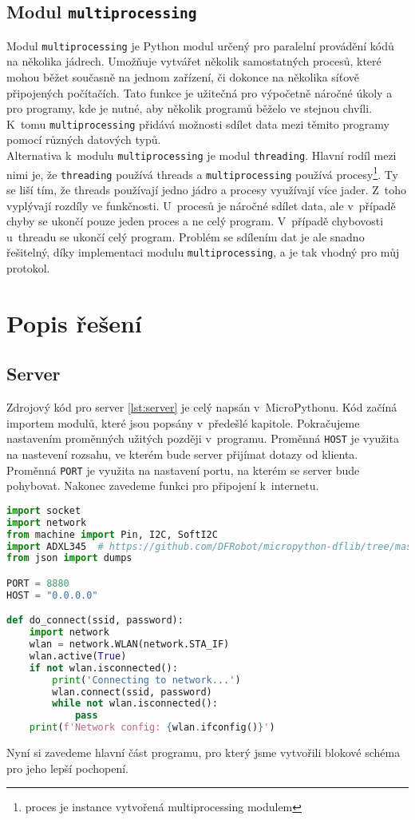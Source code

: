 \documentclass[12pt]{report}			%
\begin{document}
\subsection{Modul \texttt{multiprocessing}}
Modul \texttt{multiprocessing} je Python modul určený pro paralelní provádění kódů na několika jádrech. Umožňuje vytvářet několik samostatných procesů, které mohou běžet současně na jednom zařízení, či dokonce na několika síťově připojených počítačích. Tato funkce je užitečná pro výpočetně náročné úkoly a pro programy, kde je nutné, aby několik programů běželo ve stejnou chvíli. K~tomu \texttt{multiprocessing} přidává možnosti sdílet data mezi těmito programy pomocí různých datových typů. \cite{multiprocess}
\\
Alternativa k~modulu \texttt{multiprocessing} je modul \texttt{threading}. Hlavní rodíl mezi nimi je, že \texttt{threading} používá threads a \texttt{multiprocessing} používá procesy\footnote{proces je instance vytvořená multiprocessing modulem}. Ty se liší tím, že threads používají jedno jádro a procesy využívají více jader. Z~toho vyplývají rozdíly ve funkčnosti. U~procesů je náročné sdílet data, ale v~případě chyby se ukončí pouze jeden proces a ne celý program. V~případě chybovosti u~threadu se ukončí celý program. Problém se sdílením dat je ale snadno řešitelný, díky implementaci modulu \texttt{multiprocessing}, a je tak vhodný pro můj protokol. \cite{threading}


\section{Popis řešení}
\subsection{Server}
Zdrojový kód pro server \ref{lst:server} je celý napsán v~MicroPythonu. Kód začíná importem modulů, které jsou popsány v~předešlé kapitole. Pokračujeme nastavením proměnných užitých později v~programu. Proměnná \texttt{HOST} je využita na nastevení rozsahu, ve kterém bude server přijímat dotazy od klienta. Proměnná \texttt{PORT} je využita na nastavení portu, na kterém se server bude pohybovat. Nakonec zavedeme funkci pro připojení k~internetu.
\begin{lstlisting}[title={Program server.py}, caption={server.py}, language=Python]
import socket
import network
from machine import Pin, I2C, SoftI2C
import ADXL345  # https://github.com/DFRobot/micropython-dflib/tree/master/ADXL345
from json import dumps

PORT = 8880
HOST = "0.0.0.0"

def do_connect(ssid, password):
    import network
    wlan = network.WLAN(network.STA_IF)
    wlan.active(True)
    if not wlan.isconnected():
        print('Connecting to network...')
        wlan.connect(ssid, password)
        while not wlan.isconnected():
            pass
    print(f'Network config: {wlan.ifconfig()}')

\end{lstlisting}
Nyní si zavedeme hlavní část programu, pro který jsme vytvořili blokové schéma pro jeho lepší pochopení. 
\end{document}
